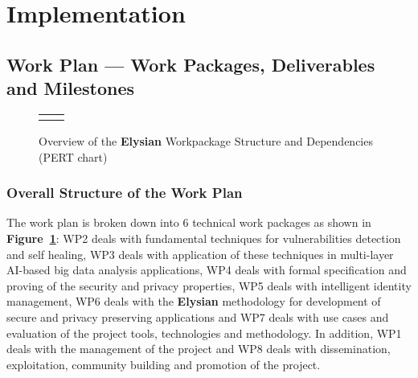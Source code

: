 \documentclass[a4paper,11pt]{article}
\newcommand{\project}[1]{\textbf{#1}\xspace}
\newcommand{\SECURITY}{\project{Elysian}}
\newcommand{\TheProject}{\SECURITY}
\begin{document}
\clearpage
\section{Implementation}

\subsection{Work Plan --- Work Packages, Deliverables and Milestones}
\label{sect:workplan}


\begin{figure}[tp]
\begin{center}
\vspace{-5mm}
\begin{tabular}{ll}
\hspace{-0.75in}
[scale=0.5]{PertChart.pdf}
\vspace{-10mm}
\end{tabular}
\caption{Overview of the \TheProject{} Workpackage Structure and Dependencies (PERT chart)}
\label{fig:wps}
\end{center}
\end{figure}

\subsubsection*{Overall Structure of the Work Plan}

The work plan is broken down into 6 technical work packages as shown
in \textbf{Figure~\ref{fig:wps}}: WP2 deals with fundamental techniques for vulnerabilities detection and self healing, WP3 deals with application of these techniques in multi-layer AI-based big data analysis applications, WP4 deals with formal specification and proving of the security and privacy properties, WP5 deals with intelligent identity management, WP6 deals with the \TheProject{} methodology for development of secure and privacy preserving applications and WP7 deals with use cases and evaluation of the project tools, technologies and methodology. In addition, WP1 deals with the management of the project and WP8 deals with dissemination, exploitation, community building and promotion of the project.



\bigskip\bigskip
\addtocounter{subsubsection}{1}
\fbox{\begin{minipage}{\textwidth}\begin{center}{\Large\bf
        Work package list} %
  \end{center}
  \end{minipage}}
\end{document}
